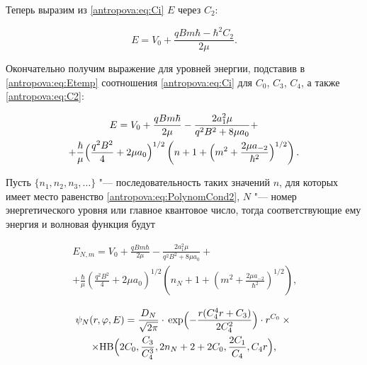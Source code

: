 Теперь выразим из \eqref{antropova:eq:Ci} $E$ через $C_2$:

\begin{equation}

E = V_0 + \frac{qBm\hbar-\hbar^2C_2}{2\mu}.

\label{antropova:eq:Etemp}

\end{equation}



Окончательно получим выражение для уровней энергии, подставив в \eqref{antropova:eq:Etemp} соотношения \eqref{antropova:eq:Ci} для $C_0$, $C_3$, $C_4$, а также \eqref{antropova:eq:C2}:

\begin{multline}\label{antropova:eq:EFull}

E = V_0 + \frac{qBm\hbar}{2\mu} - \frac{2a_1^2\mu}{q^2B^2 + 8\mu{}a_0} + \\

 + \frac{\hbar}{\mu}\Bigl(\frac{q^2B^2}{4} + 2\mu{}a_0\Bigr)^{1/2}\left(n + 1 + \Bigl(m^2 + \frac{2\mu{}a_{-2}}{\hbar^2}\Bigr)^{1/2}\right).

\end{multline}



Пусть $\lbrace{}n_1,n_2,n_3,\dotsc\rbrace$ "--- последовательность таких значений $n$, для которых имеет место равенство \eqref{antropova:eq:PolynomCond2}, $N$ "--- номер энергетического уровня или главное квантовое число, тогда соответствующие ему энергия и волновая функция будут

\begin{multline*}


E_{N,m} = V_0 + \frac{qBm\hbar}{2\mu} - \frac{2a_1^2\mu}{q^2B^2 + 8\mu{}a_0} + \\ + \frac{\hbar}{\mu}\left(\frac{q^2B^2}{4} + 2\mu{}a_0\right)^{1/2}\left(n_N + 1 + \left(m^2 + \frac{2\mu{}a_{-2}}{\hbar^2}\right)^{1/2}\right) \text{,}

\end{multline*}

\begin{multline*}


\psi_N(r,\varphi,E) = \frac{D_N}{\sqrt{2\pi}}\cdot{}\exp\Bigl({-\frac{r(C_4^4r + C_3)}{2C_4^2}}\Bigr)\cdot{}r^{C_0}\times{}\\

\times\text{HB}\Bigl(2C_0,\frac{C_3}{C_4^3}, 2n_N + 2 + 2C_0 ,\frac{2C_1}{C_4},C_4r\Bigr)\text{,}

\end{multline*}

